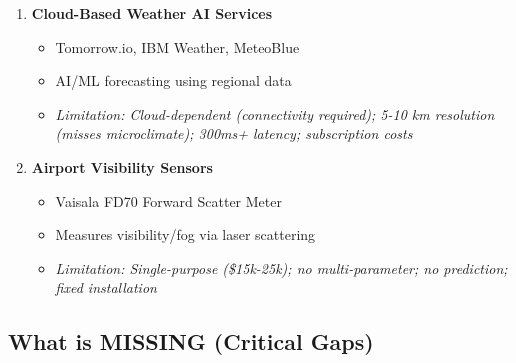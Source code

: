 \begin{enumerate}[leftmargin=*]
    \item \textcolor{existingcolor}{\textbf{Cloud-Based Weather AI Services}}
    \begin{itemize}
        \item Tomorrow.io, IBM Weather, MeteoBlue
        \item AI/ML forecasting using regional data
        \item \textit{Limitation: Cloud-dependent (connectivity required); 5-10 km resolution (misses microclimate); 300ms+ latency; subscription costs}
    \end{itemize}
    
    \item \textcolor{existingcolor}{\textbf{Airport Visibility Sensors}}
    \begin{itemize}
        \item Vaisala FD70 Forward Scatter Meter
        \item Measures visibility/fog via laser scattering
        \item \textit{Limitation: Single-purpose (\$15k-25k); no multi-parameter; no prediction; fixed installation}
    \end{itemize}
\end{enumerate}

\subsection{What is MISSING (Critical Gaps)}

